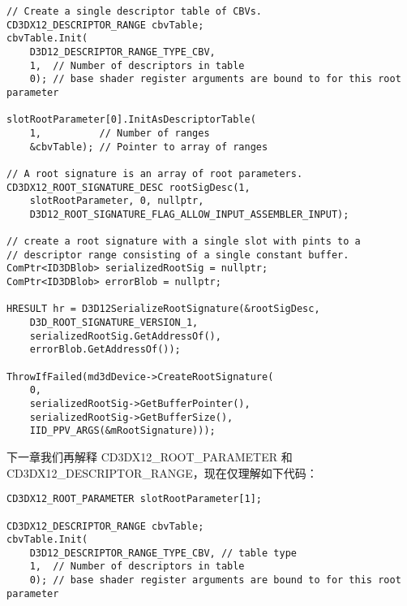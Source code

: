 \begin{flushleft}
\begin{lstlisting}
// Create a single descriptor table of CBVs.
CD3DX12_DESCRIPTOR_RANGE cbvTable;
cbvTable.Init(
    D3D12_DESCRIPTOR_RANGE_TYPE_CBV,
    1,  // Number of descriptors in table
    0); // base shader register arguments are bound to for this root parameter

slotRootParameter[0].InitAsDescriptorTable(
    1,          // Number of ranges
    &cbvTable); // Pointer to array of ranges

// A root signature is an array of root parameters.
CD3DX12_ROOT_SIGNATURE_DESC rootSigDesc(1, 
    slotRootParameter, 0, nullptr, 
    D3D12_ROOT_SIGNATURE_FLAG_ALLOW_INPUT_ASSEMBLER_INPUT);

// create a root signature with a single slot with pints to a
// descriptor range consisting of a single constant buffer.
ComPtr<ID3DBlob> serializedRootSig = nullptr;
ComPtr<ID3DBlob> errorBlob = nullptr;

HRESULT hr = D3D12SerializeRootSignature(&rootSigDesc, 
    D3D_ROOT_SIGNATURE_VERSION_1,
    serializedRootSig.GetAddressOf(),
    errorBlob.GetAddressOf());

ThrowIfFailed(md3dDevice->CreateRootSignature(
    0,
    serializedRootSig->GetBufferPointer(),
    serializedRootSig->GetBufferSize(),
    IID_PPV_ARGS(&mRootSignature)));
\end{lstlisting}
下一章我们再解释 CD3DX12\_ROOT\_PARAMETER 和 CD3DX12\_DESCRIPTOR\_RANGE，现在仅理解如下代码：\\
\begin{lstlisting}
CD3DX12_ROOT_PARAMETER slotRootParameter[1];

CD3DX12_DESCRIPTOR_RANGE cbvTable;
cbvTable.Init(
    D3D12_DESCRIPTOR_RANGE_TYPE_CBV, // table type
    1,  // Number of descriptors in table
    0); // base shader register arguments are bound to for this root parameter


\end{lstlisting}
\end{flushleft}
